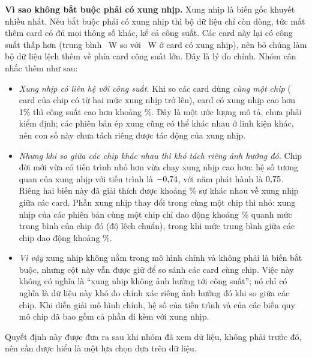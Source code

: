 \textbf{Vì sao không bắt buộc phải có xung nhịp.} Xung nhịp là biến gốc khuyết nhiều
nhất. Nếu bắt buộc phải có xung nhịp thì bộ dữ liệu chỉ còn \PreRowsIfCoreRequired{} dòng, tức
mất thêm \PreCoreMissingInFinal{} card có đủ mọi thông số khác, kể cả công suất. Các card
này lại có công suất thấp hơn (trung bình \PreCoreMissingPowerMean~W so với
\PreCoreKnownPowerMean~W ở card có xung nhịp), nên bỏ chúng làm bộ dữ liệu lệch thêm về
phía card công suất lớn. Đây là lý do chính. Nhóm cân nhắc thêm như sau:
\begin{itemize}
  \item \emph{Xung nhịp có liên hệ với công suất.} Khi so các card dùng \emph{cùng một
    chip} (\PreCoreWithinChipCards{} card của \PreCoreWithinChipChips{} chip có từ hai mức
    xung nhịp trở lên), card có xung nhịp cao hơn 1\% thì công suất cao hơn khoảng
    \PreCoreWithinChipElasticity\%. Đây là một ước lượng mô tả, chưa phải kiểm định; các
    phiên bản ép xung cũng có thể khác nhau ở linh kiện khác, nên con số này chưa tách
    riêng được tác động của xung nhịp.
  \item \emph{Nhưng khi so giữa các chip khác nhau thì khó tách riêng ảnh hưởng đó.} Chip đời mới vừa có tiến trình nhỏ hơn vừa chạy xung nhịp cao hơn: hệ số tương
    quan của xung nhịp với tiến trình là $-0{,}74$, với năm phát hành là
    $0{,}75$. Riêng hai biến này đã giải thích được khoảng
    \PreCoreExplainedPct\% sự khác nhau về xung nhịp giữa các card. Phần xung nhịp thay
    đổi trong cùng một chip thì nhỏ:
    xung nhịp của các phiên bản cùng một chip chỉ dao động khoảng
    \PreCoreWithinChipSpreadPct\% quanh mức trung bình của chip đó (độ lệch chuẩn), trong
    khi mức trung bình giữa các chip dao động khoảng \PreCoreBetweenChipSpreadPct\%.
  \item \emph{Vì vậy} xung nhịp không nằm trong mô hình chính và không phải là biến bắt
    buộc, nhưng cột này vẫn được giữ để so sánh các card cùng chip. Việc này không có
    nghĩa là ``xung nhịp không ảnh hưởng tới công suất''; nó chỉ có nghĩa là dữ liệu này
    khó đo chính xác riêng ảnh hưởng đó khi so giữa các chip. Khi diễn giải mô hình chính,
    hệ số của tiến trình và của các biến quy mô chip đã bao gồm cả phần đi kèm với xung
    nhịp.
\end{itemize}
Quyết định này được đưa ra sau khi nhóm đã xem dữ liệu, không phải trước đó, nên cần được
hiểu là một lựa chọn dựa trên dữ liệu.

